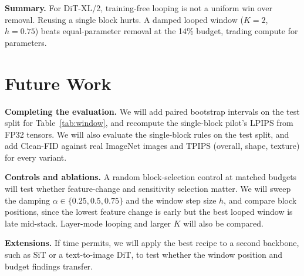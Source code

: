 \documentclass[sigconf,nonacm]{acmart}
\begin{document}
\textbf{Summary.} For DiT-XL/2, training-free looping is not a uniform win over removal.
Reusing a single block hurts. A damped looped window ($K=2$, $h=0.75$) beats
equal-parameter removal at the 14\% budget, trading compute for parameters.

\section{Future Work}

\textbf{Completing the evaluation.} We will add paired bootstrap intervals on the test
split for Table~\ref{tab:window}, and recompute the single-block pilot's LPIPS from FP32
tensors. We will also evaluate the single-block rules on the test split, and add
Clean-FID against real ImageNet images and TPIPS (overall, shape, texture) for every
variant.

\textbf{Controls and ablations.} A random block-selection control at matched budgets
will test whether feature-change and sensitivity selection matter. We will sweep the
damping $\alpha\in\{0.25,0.5,0.75\}$ and the window step size $h$, and compare block
positions, since the lowest feature change is early but the best looped window is late
mid-stack. Layer-mode looping and larger $K$ will also be compared.

\textbf{Extensions.} If time permits, we will apply the best recipe to a second
backbone, such as SiT or a text-to-image DiT, to test whether the window position and
budget findings transfer.
\end{document}
